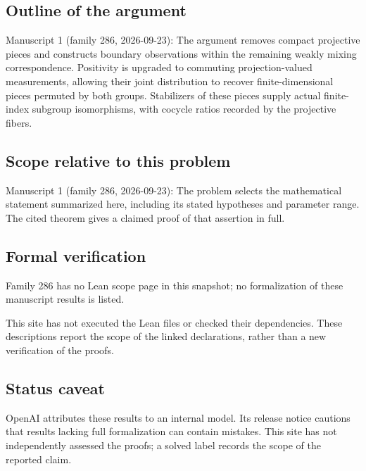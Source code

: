 \documentclass[11pt]{article}
\begin{document}
\subsection{Outline of the argument}
Manuscript 1 (family 286, 2026-09-23): The argument removes compact projective pieces and constructs boundary observations within the remaining weakly mixing correspondence. Positivity is upgraded to commuting projection-valued measurements, allowing their joint distribution to recover finite-dimensional pieces permuted by both groups. Stabilizers of these pieces supply actual finite-index subgroup isomorphisms, with cocycle ratios recorded by the projective fibers.

\subsection{Scope relative to this problem}
Manuscript 1 (family 286, 2026-09-23): The problem selects the mathematical statement summarized here, including its stated hypotheses and parameter range. The cited theorem gives a claimed proof of that assertion in full.

\subsection{Formal verification}
Family 286 has no Lean scope page in this snapshot; no formalization of these manuscript results is listed.

This site has not executed the Lean files or checked their dependencies. These descriptions report the scope of the linked declarations, rather than a new verification of the proofs.

\subsection{Status caveat}
OpenAI attributes these results to an internal model. Its release notice cautions that results lacking full formalization can contain mistakes. This site has not independently assessed the proofs; a solved label records the scope of the reported claim.
\end{document}

